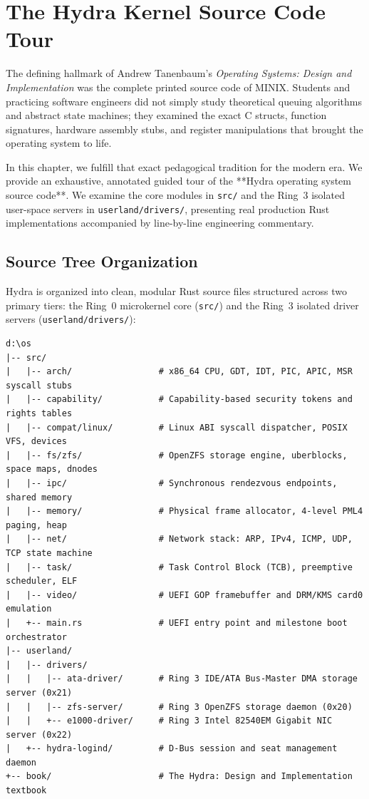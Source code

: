 \chapter{The Hydra Kernel Source Code Tour}
\label{chap:source_tour}

The defining hallmark of Andrew Tanenbaum's \textit{Operating Systems: Design and Implementation} was the complete printed source code of MINIX. Students and practicing software engineers did not simply study theoretical queuing algorithms and abstract state machines; they examined the exact C structs, function signatures, hardware assembly stubs, and register manipulations that brought the operating system to life.

In this chapter, we fulfill that exact pedagogical tradition for the modern era. We provide an exhaustive, annotated guided tour of the **Hydra operating system source code**. We examine the core modules in \texttt{src/} and the Ring~3 isolated user-space servers in \texttt{userland/drivers/}, presenting real production Rust implementations accompanied by line-by-line engineering commentary.

\section{Source Tree Organization}
\label{sec:source_organization}

Hydra is organized into clean, modular Rust source files structured across two primary tiers: the Ring~0 microkernel core (\texttt{src/}) and the Ring~3 isolated driver servers (\texttt{userland/drivers/}):

\begin{verbatim}
d:\os
|-- src/
|   |-- arch/                 # x86_64 CPU, GDT, IDT, PIC, APIC, MSR syscall stubs
|   |-- capability/           # Capability-based security tokens and rights tables
|   |-- compat/linux/         # Linux ABI syscall dispatcher, POSIX VFS, devices
|   |-- fs/zfs/               # OpenZFS storage engine, uberblocks, space maps, dnodes
|   |-- ipc/                  # Synchronous rendezvous endpoints, shared memory
|   |-- memory/               # Physical frame allocator, 4-level PML4 paging, heap
|   |-- net/                  # Network stack: ARP, IPv4, ICMP, UDP, TCP state machine
|   |-- task/                 # Task Control Block (TCB), preemptive scheduler, ELF
|   |-- video/                # UEFI GOP framebuffer and DRM/KMS card0 emulation
|   +-- main.rs               # UEFI entry point and milestone boot orchestrator
|-- userland/
|   |-- drivers/
|   |   |-- ata-driver/       # Ring 3 IDE/ATA Bus-Master DMA storage server (0x21)
|   |   |-- zfs-server/       # Ring 3 OpenZFS storage daemon (0x20)
|   |   +-- e1000-driver/     # Ring 3 Intel 82540EM Gigabit NIC server (0x22)
|   +-- hydra-logind/         # D-Bus session and seat management daemon
+-- book/                     # The Hydra: Design and Implementation textbook
\end{verbatim}

